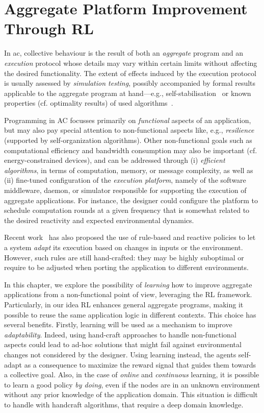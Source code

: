 \section{Aggregate Platform Improvement Through \Acl{RL}}\label{acsos2022:sec:contribution}
In \ac{ac}, collective behaviour 
 is the result of both
 an \emph{aggregate} program
 and an \emph{execution} protocol
 whose details may vary within certain limits
 without affecting the desired functionality.
%
The extent of effects induced by the execution protocol
 is usually assessed by \emph{simulation testing},
 possibly accompanied by formal results applicable to the aggregate program at hand---e.g., self-stabilisation~\cite{DBLP:journals/tomacs/ViroliABDP18}
  or known properties (cf. optimality results) of used algorithms~\cite{DBLP:conf/saso/AudritoCDV17,DBLP:journals/cee/AudritoCDPV21}.

Programming in \ac{AC}
 focusses primarily on \emph{functional} aspects of an application,
 but may also pay special attention to non-functional aspects like, e.g., \emph{resilience} (supported by self-organization algorithms).
%
Other non-functional goals such as computational efficiency and bandwidth consumption may also be important (cf. energy-constrained devices), 
 and can be addressed through (i) \emph{efficient algorithms}, in terms of computation, memory, or message complexity,
 as well as 
 (ii) fine-tuned configuration of the \emph{execution platform}, namely of the software middleware, daemon, or simulator responsible for supporting the execution of aggregate applications. 
%
For instance, the designer could configure the platform 
 to schedule computation rounds 
 at a given frequency
 that is somewhat related to the desired reactivity
 and expected environmental dynamics.

Recent work~\cite{danilo2021lmcs} has also proposed the use of rule-based and reactive policies to let a system \emph{adapt} its execution based on changes in inputs or the environment.
%
However, such rules are still hand-crafted: they may be highly suboptimal or require to be adjusted when porting the application to different environments.

In this chapter, we explore the possibility of \emph{learning} 
 how to improve aggregate applications from a non-functional point of view, 
 leveraging the \ac{RL} framework.
%
Particularly, in our idea \ac{RL} enhances general aggregate programs, 
 making it possible to reuse the same application logic in different contexts.
%
This choice has several benefits.
 Firstly, learning will be used as a mechanism to improve \emph{adaptability}. 
 Indeed, using hand-craft approaches to handle non-functional aspects 
 could lead to ad-hoc solutions that might fail against environmental 
 changes not considered by the designer.
%
Using learning instead, the agents self-adapt as a consequence 
 to maximize the reward signal that guides them towards a collective goal. 
%
Also, in the case of \emph{online} and \emph{continuous} learning, 
 it is possible to learn a good policy \emph{by doing}, 
 even if the nodes are in an unknown environment without any prior knowledge of the application domain.
%
This situation is difficult to handle with handcraft algorithms, that require a deep domain knowledge.

